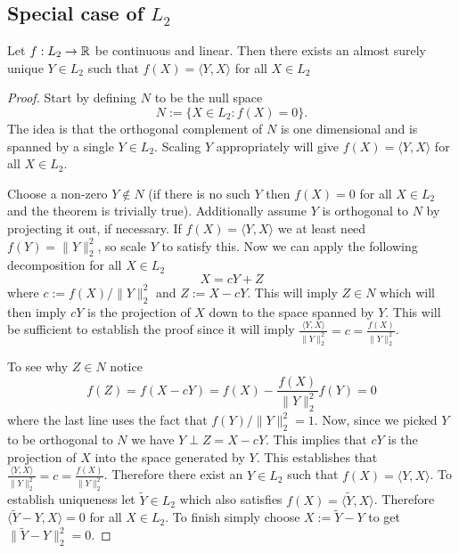 \subsection{Special case of $L_2$}

\begin{theorem}
\label{thm: riesz}
Let $f:L_2\rightarrow \Bbb R$ be continuous and linear. Then there exists an almost surely unique $Y\in L_2$ such that $f(X) = \langle Y, X\rangle$ for all $X\in L_2$
\end{theorem}
\begin{proof}
Start by defining $N$ to be the null space
\[
N:= \{X\in L_2\colon f(X) = 0\}.
\]
The idea is that the orthogonal complement of $N$ is one dimensional and is spanned by a single $Y\in L_2$. Scaling $Y$ appropriately will give $f(X) = \langle Y, X\rangle$ for all $X\in L_2$.

Choose a non-zero $Y\notin N$  (if there is no such $Y$ then $f(X)=0$ for all $X\in L_2$ and the theorem is trivially true). Additionally assume $Y$ is orthogonal to $N$ by projecting it out, if necessary. If $f(X) = \langle Y, X\rangle$ we at least need $f(Y) = \| Y\|_2^2$, so scale $Y$ to satisfy this. Now we can apply the following decomposition for all $X\in L_2$
\begin{equation}
X = cY + Z
\end{equation}
where $c := f(X)/ \| Y \|_2^2$ and $Z := X - cY$. This will imply $Z\in N$ which will then imply $cY$ is the projection of $X$ down to the space spanned by $Y$. This will be sufficient to establish the proof since it will imply $\frac{\langle Y, X \rangle}{\| Y\|_2^2} = c = \frac{f(X)}{ \| Y \|_2^2}$.

To see why $Z\in N$ notice
\[f(Z) = f(X - cY) = f(X) - \textstyle\frac{f(X)}{\,\| Y\|_2^2} f(Y) = 0 \]
where the last line uses the fact that $f(Y)/\| Y\|_2^2 = 1$. Now, since we picked $Y$ to be orthogonal to $N$ we have $Y \perp Z = X - cY $. This implies that $cY$ is the projection of $X$ into the space generated by $Y$. This establishes that $\frac{\langle Y, X \rangle}{\| Y\|_2^2} = c = \frac{f(X)}{ \| Y \|_2^2}$. Therefore there exist an $Y\in L_2$ such that $f(X) = \langle Y, X\rangle$. To establish uniqueness let $\widetilde Y\in L_2$ which also satisfies $f(X) = \langle \widetilde Y, X\rangle $. Therefore $\langle \widetilde Y - Y, X \rangle=0$ for all $X\in L_2$. To finish simply choose $X :=\widetilde Y - Y $ to get $\| \widetilde Y - Y\|_2^2 = 0$.

\end{proof}


